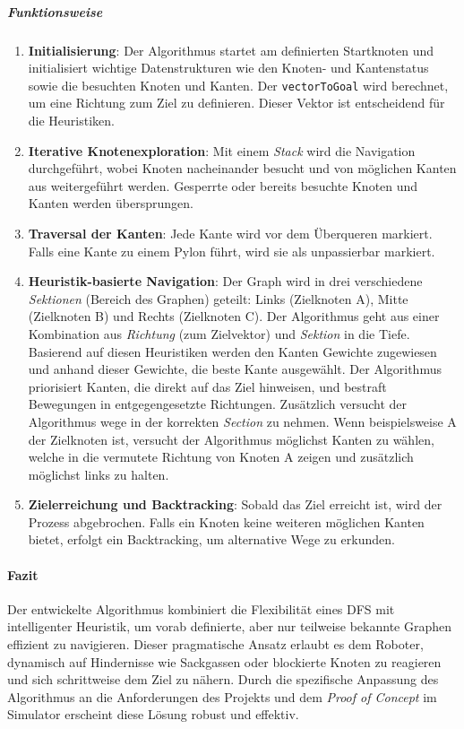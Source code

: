 \documentclass[main.tex]{subfiles} %
\begin{document}
\subparagraph{Funktionsweise}
\begin{enumerate}
    \item \textbf{Initialisierung}:  
    Der Algorithmus startet am definierten Startknoten und initialisiert wichtige Datenstrukturen wie den Knoten- und Kantenstatus sowie die besuchten Knoten und Kanten. Der \texttt{vectorToGoal} wird berechnet, um eine Richtung zum Ziel zu definieren. Dieser Vektor ist entscheidend für die Heuristiken.

    \item \textbf{Iterative Knotenexploration}:  
    Mit einem \textit{Stack} wird die Navigation durchgeführt, wobei Knoten nacheinander besucht und von möglichen Kanten aus weitergeführt werden. Gesperrte oder bereits besuchte Knoten und Kanten werden übersprungen.

    \item \textbf{Traversal der Kanten}:  
    Jede Kante wird vor dem Überqueren markiert. Falls eine Kante zu einem Pylon führt, wird sie als unpassierbar markiert.

    \item \textbf{Heuristik-basierte Navigation}:
    Der Graph wird in drei verschiedene \textit{Sektionen} (Bereich des Graphen) geteilt: Links (Zielknoten A), Mitte (Zielknoten B) und Rechts (Zielknoten C).
    Der Algorithmus geht aus einer Kombination aus \textit{Richtung} (zum Zielvektor) und \textit{Sektion} in die Tiefe.
    Basierend auf diesen Heuristiken werden den Kanten Gewichte zugewiesen und anhand dieser Gewichte, die beste Kante ausgewählt.
    Der Algorithmus priorisiert Kanten, die direkt auf das Ziel hinweisen, und bestraft Bewegungen in entgegengesetzte Richtungen. Zusätzlich versucht der Algorithmus wege in der korrekten \textit{Section} zu nehmen. Wenn beispielsweise A der Zielknoten ist, versucht der Algorithmus möglichst Kanten zu wählen, welche in die vermutete Richtung von Knoten A zeigen und zusätzlich möglichst links zu halten. 

    \item \textbf{Zielerreichung und Backtracking}:  
    Sobald das Ziel erreicht ist, wird der Prozess abgebrochen. Falls ein Knoten keine weiteren möglichen Kanten bietet, erfolgt ein Backtracking, um alternative Wege zu erkunden.
\end{enumerate}

\paragraph{Fazit}

Der entwickelte Algorithmus kombiniert die Flexibilität eines DFS mit intelligenter Heuristik, um vorab definierte, aber nur teilweise bekannte Graphen effizient zu navigieren. Dieser pragmatische Ansatz erlaubt es dem Roboter, dynamisch auf Hindernisse wie Sackgassen oder blockierte Knoten zu reagieren und sich schrittweise dem Ziel zu nähern. Durch die spezifische Anpassung des Algorithmus an die Anforderungen des Projekts und dem \textit{Proof of Concept} im Simulator erscheint diese Lösung robust und effektiv.
\end{document}

